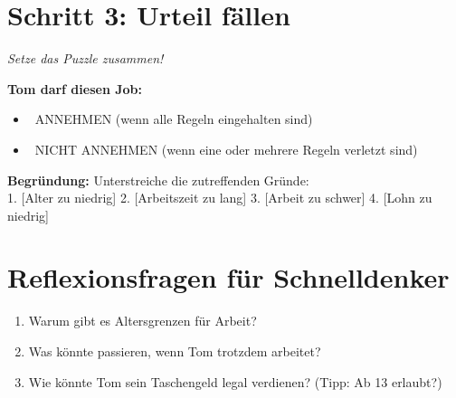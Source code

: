 \documentclass[12pt, a4paper]{article}
\newenvironment{taskbox}{%
	\begin{framed}
		\color{black}
	}{%
	\end{framed}
}
\newcommand{\checkbox}{\raisebox{-0.2ex}{\Large$\square$}}
\begin{document}
	\vspace{0.3cm}
	
	\section*{\color{taskgold}Schritt 3: Urteil fällen}
	
	\begin{taskbox}
		\textit{Setze das Puzzle zusammen!}
		
		\textbf{Tom darf diesen Job:}
		\begin{itemize}[leftmargin=*]
			\item \checkbox\ \textcolor{acceptgreen}{ANNEHMEN} (wenn alle Regeln eingehalten sind)
			\item \checkbox\ \textcolor{rejectred}{NICHT ANNEHMEN} (wenn eine oder mehrere Regeln verletzt sind)
		\end{itemize}
		
		\textbf{Begründung:} Unterstreiche die zutreffenden Gründe:\\
		1. [Alter zu niedrig] 2. [Arbeitszeit zu lang] 3. [Arbeit zu schwer] 4. [Lohn zu niedrig]
	\end{taskbox}
	
	\vspace{0.3cm}
	
	\section*{\color{taskgreen}Reflexionsfragen für Schnelldenker}
	
	\begin{taskbox}
		\begin{enumerate}
			\item Warum gibt es Altersgrenzen für Arbeit?
			\item Was könnte passieren, wenn Tom trotzdem arbeitet?
			\item Wie könnte Tom sein Taschengeld legal verdienen? (Tipp: Ab 13 erlaubt?)
		\end{enumerate}
	\end{taskbox}
	
\end{document}
